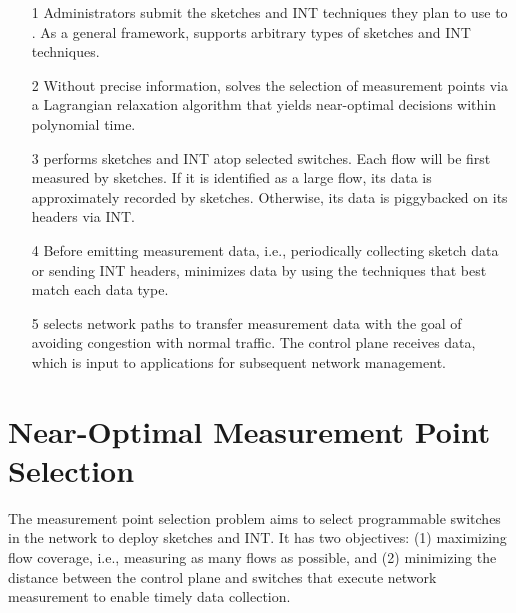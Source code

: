 \begin{itemize}[leftmargin=*]
%
    \item[1] Administrators submit the sketches and INT techniques they plan to use to \sysname. As a general framework, \sysname supports arbitrary types of sketches and INT techniques. 
%
    \item[2] Without precise information, \sysname solves the selection of measurement points via a Lagrangian relaxation algorithm that yields near-optimal decisions within polynomial time.
%
    \item[3] \sysname performs sketches and INT atop selected switches. Each flow will be first measured by sketches. If it is identified as a large flow, its data is approximately recorded by sketches. Otherwise, its data is piggybacked on its headers via INT. 
%
    \item[4] Before emitting measurement data, i.e., periodically collecting sketch data or sending INT headers, \sysname minimizes data by using the techniques that best match each data type. 
%
    \item[5] \sysname selects network paths to transfer measurement data with the goal of avoiding congestion with normal traffic. The control plane receives data, which is input to applications for subsequent network management. 
%
\end{itemize}



\section{Near-Optimal Measurement Point Selection}

 The measurement point selection problem aims to select programmable switches in the network to deploy sketches and INT. It has two objectives: (1) maximizing flow coverage, i.e., measuring as many flows as possible, and (2) minimizing the distance between the control plane and switches that execute network measurement to enable timely data collection.

